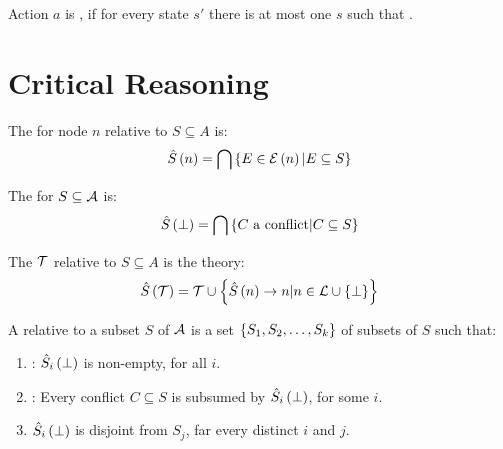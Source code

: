 \begin{defi}
Action $a$ is , if for every state $s'$ there is at most one $s$ such that .
\cite{conf/ijcai/AmirR03}
\end{defi}

\section{Critical Reasoning}

\begin{defi}
The  for node $n$ relative to $S\subseteq A$ is:
\begin{equation}
\hat{S}\left(n\right)=\displaystyle\bigcap\left\{ E\in\mathcal{E}\left(n\right)|E\subseteq S\right\}
\end{equation}
\cite{conf/ijcai/RaimanKS93}
\end{defi}

\begin{defi}
The  for $S\subseteq\mathcal{A}$ is:
\begin{equation}
\hat{S}\left(\bot\right)=\displaystyle\bigcap\left\{ C\mbox{ a conflict}|C\subseteq S\right\}
\end{equation}
\cite{conf/ijcai/RaimanKS93}
\end{defi}

\begin{defi}
The  $\mathcal{T}$ relative to $S\subseteq A$ is the theory:
\begin{equation}
\hat{S}\left(\mathcal{T}\right)=\mathcal{T}\cup\left\{ \hat{S}\left(n\right)\rightarrow n|n\in\mathcal{L}\cup\left\{ \bot\right\}\right\}
\end{equation}
\cite{conf/ijcai/RaimanKS93}
\end{defi}

\begin{defi}
A  relative to a subset $S$ of $\mathcal{A}$ is a set $\left\{ S_1,S_2,\ldots,S_k\right\}$ of subsets of $S$ such that:
\begin{enumerate}
 \item {}: $\hat{S}_i\left(\bot\right)$ is non-empty, for all $i$.
 \item {}: Every conflict $C\subseteq S$ is subsumed by $\hat{S}_i\left(\bot\right)$, for some $i$.
 \item {} $\hat{S}_i\left(\bot\right)$ is disjoint from $S_j$, far every distinct $i$ and $j$.
\end{enumerate}
\cite{conf/ijcai/RaimanKS93}
\end{defi}

